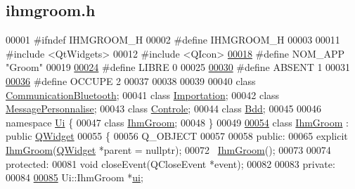 \hypertarget{ihmgroom_8h_source}{}\subsection{ihmgroom.\+h}

\begin{DoxyCode}
00001 \textcolor{preprocessor}{#ifndef IHMGROOM\_H}
00002 \textcolor{preprocessor}{#define IHMGROOM\_H}
00003 
00011 \textcolor{preprocessor}{#include <QtWidgets>}
00012 \textcolor{preprocessor}{#include <QIcon>}
\hyperlink{ihmgroom_8h_ada54de88f03c1264af632974a72cff76}{00018} \textcolor{preprocessor}{#define NOM\_APP "Groom"}
00019 
\hyperlink{ihmgroom_8h_a508cc209fbc99ea975d1c1ecb5f1c6fe}{00024} \textcolor{preprocessor}{#define LIBRE 0}
00025 
\hyperlink{ihmgroom_8h_a62d1ab4a9b5e2f95388be50a975cc97d}{00030} \textcolor{preprocessor}{#define ABSENT 1}
00031 
\hyperlink{ihmgroom_8h_a81e3b7fe26a6f7e9e070cccd7faee6bf}{00036} \textcolor{preprocessor}{#define OCCUPE 2}
00037 
00038 
00039 
00040 \textcolor{keyword}{class }\hyperlink{class_communication_bluetooth}{CommunicationBluetooth};
00041 \textcolor{keyword}{class }\hyperlink{class_importation}{Importation};
00042 \textcolor{keyword}{class }\hyperlink{class_message_personnalise}{MessagePersonnalise};
00043 \textcolor{keyword}{class }\hyperlink{class_controle}{Controle};
00044 \textcolor{keyword}{class }\hyperlink{class_bdd}{Bdd};
00045 
00046 \textcolor{keyword}{namespace }\hyperlink{namespace_ui}{Ui} \{
00047 \textcolor{keyword}{class }\hyperlink{class_ihm_groom}{IhmGroom};
00048 \}
00049 
\hyperlink{class_ihm_groom}{00054} \textcolor{keyword}{class }\hyperlink{class_ihm_groom}{IhmGroom} : \textcolor{keyword}{public} \hyperlink{class_q_widget}{QWidget}
00055 \{
00056     Q\_OBJECT
00057 
00058 \textcolor{keyword}{public}:
00065     \textcolor{keyword}{explicit} \hyperlink{class_ihm_groom}{IhmGroom}(\hyperlink{class_q_widget}{QWidget} *parent = \textcolor{keyword}{nullptr});
00072     ~\hyperlink{class_ihm_groom}{IhmGroom}();
00073 
00074 \textcolor{keyword}{protected}:
00081     \textcolor{keywordtype}{void} closeEvent(QCloseEvent *event);
00082 
00083 \textcolor{keyword}{private}:
00084 
\hyperlink{class_ihm_groom_af652e1ce199213b7867e44cf589c06b8}{00085}     Ui::IhmGroom *\hyperlink{class_ihm_groom_af652e1ce199213b7867e44cf589c06b8}{ui};                               

\end{DoxyCode}
